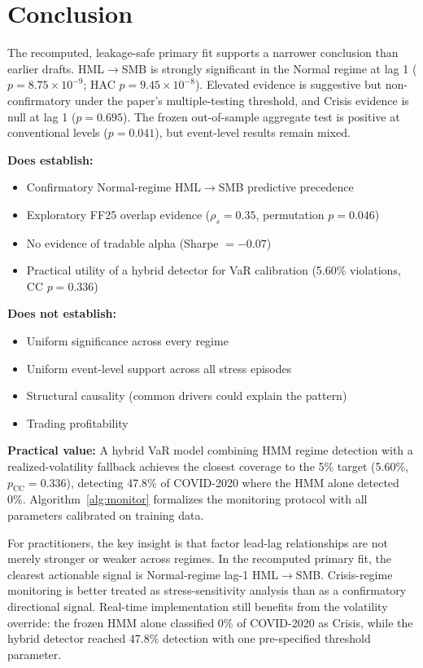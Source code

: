\documentclass{uai2026}
\begin{document}
\section{Conclusion}

The recomputed, leakage-safe primary fit supports a narrower conclusion than
earlier drafts. HML$\to$SMB is strongly significant in the Normal regime at lag 1
($p = 8.75 \times 10^{-9}$; HAC $p = 9.45 \times 10^{-8}$). Elevated evidence is
suggestive but non-confirmatory under the paper's multiple-testing threshold,
and Crisis evidence is null at lag 1 ($p = 0.695$). The frozen out-of-sample
aggregate test is positive at conventional levels ($p = 0.041$), but event-level
results remain mixed.

\textbf{Does establish:}
\begin{itemize}
    \item Confirmatory Normal-regime HML$\to$SMB predictive precedence
    \item Exploratory FF25 overlap evidence ($\rho_s = 0.35$, permutation $p = 0.046$)
    \item No evidence of tradable alpha (Sharpe $= -0.07$)
    \item Practical utility of a hybrid detector for VaR calibration
    (5.60\% violations, CC $p = 0.336$)
\end{itemize}

\textbf{Does not establish:}
\begin{itemize}
    \item Uniform significance across every regime
    \item Uniform event-level support across all stress episodes
    \item Structural causality (common drivers could explain the pattern)
    \item Trading profitability
\end{itemize}

\textbf{Practical value:} A hybrid VaR model combining HMM regime detection
with a realized-volatility fallback achieves the closest coverage to the 5\%
target (5.60\%, $p_{\text{CC}} = 0.336$), detecting 47.8\% of COVID-2020
where the HMM alone detected 0\%. Algorithm~\ref{alg:monitor} formalizes
the monitoring protocol with all parameters calibrated on training data.

For practitioners, the key insight is that factor lead-lag relationships are not
merely stronger or weaker across regimes. In the recomputed primary fit,
the clearest actionable signal is Normal-regime lag-1 HML$\to$SMB. Crisis-regime
monitoring is better treated as stress-sensitivity analysis than as a
confirmatory directional signal. Real-time implementation still benefits from
the volatility override: the frozen HMM alone classified 0\% of COVID-2020 as
Crisis, while the hybrid detector reached 47.8\% detection with one
pre-specified threshold parameter.


\end{document}
